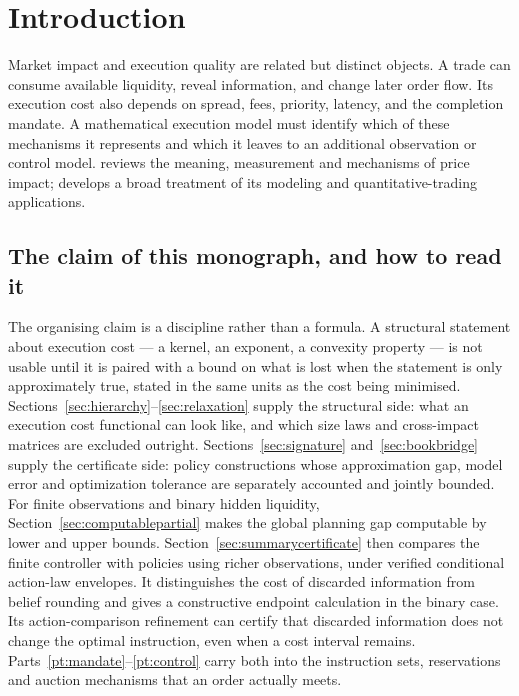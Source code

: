 \documentclass[11pt]{article}
\numberwithin{equation}{section}
\theoremstyle{definition}
\theoremstyle{remark}
\theoremstyle{definition}
\begin{document}
\section{Introduction}

Market impact and execution quality are related but distinct objects. A trade can
consume available liquidity, reveal information, and change later order flow. Its
execution cost also depends on spread, fees, priority, latency, and the completion
mandate. A mathematical execution model must identify which of these mechanisms it
represents and which it leaves to an additional observation or control model.
\citet{bouchaud2009review} reviews the meaning, measurement and mechanisms of
price impact; \citet{webster2023} develops a broad treatment of its modeling
and quantitative-trading applications.

\subsection{The claim of this monograph, and how to read it}
\label{sec:readingguide}

The organising claim is a discipline rather than a formula. A structural
statement about execution cost --- a kernel, an exponent, a convexity property
--- is not usable until it is paired with a bound on what is lost when the
statement is only approximately true, stated in the same units as the cost
being minimised. Sections~\ref{sec:hierarchy}--\ref{sec:relaxation} supply the
structural side: what an execution cost functional can look like, and which
size laws and cross-impact matrices are excluded outright.
Sections~\ref{sec:signature} and~\ref{sec:bookbridge} supply the certificate side:
policy constructions whose approximation gap, model error and optimization
tolerance are separately accounted and jointly bounded. For finite observations
and binary hidden liquidity, Section~\ref{sec:computablepartial} makes the global
planning gap computable by lower and upper bounds.
Section~\ref{sec:summarycertificate} then compares the finite controller with
policies using richer observations, under verified conditional action-law
envelopes. It distinguishes the cost of discarded information from belief
rounding and gives a constructive endpoint calculation in the binary case.
Its action-comparison refinement can certify that discarded information
does not change the optimal instruction, even when a cost interval remains.
Parts~\ref{pt:mandate}--\ref{pt:control} carry both into the instruction
sets, reservations and auction mechanisms that an order actually meets.
\end{document}
